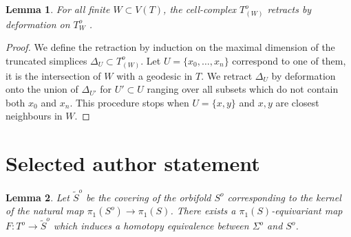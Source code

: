 \documentclass[10pt,a4paper]{amsart}
\newtheorem{lemma}{Lemma}
\begin{document}
\begin{lemma}\label{retraction}
For all finite $W\subset V(T)$, the cell-complex $T^o_{(W)}$ retracts by deformation on $T^o_W$ .
\end{lemma}

\begin{proof}
We define the retraction by induction on the maximal dimension of the truncated simplices $\Delta_U\subset T^o_{(W)}$. %
Let $U =\{x_0,\dots,x_n\}$ correspond to one of them, it is the intersection of $W$ with a geodesic in $T$. We retract $\Delta_U$ by deformation onto the union of $\Delta_{U'}$ for $U'\subset U$ ranging over all subsets which do not contain both $x_0$ and $x_n$. %
This procedure stops when $U=\{x,y\}$ and $x,y$ are closest neighbours in $W$.
\end{proof}
\section*{Selected author statement}
\begin{lemma}\label{equiv-homotopy}
Let $\tilde{S}^o$ be the covering of the orbifold $S^o$ corresponding to the kernel of the natural map $\pi_1(S^o)\to \pi_1(S)$. There exists a $\pi_1(S)$-equivariant map $F:T^o\to \tilde{S}^o$ which induces a homotopy equivalence between $\Sigma^o$ and $S^o$.
\end{lemma}
\end{document}
